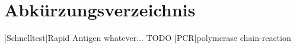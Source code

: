 \clearpage
\chapter*{Abkürzungsverzeichnis}	

\begin{acronym}[XXXXXXX]
	[Schnelltest]{Rapid Antigen whatever... TODO}
	[PCR]{polymerase chain-reaction}

\end{acronym}